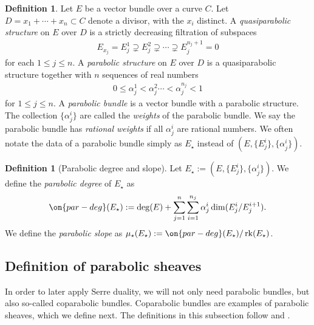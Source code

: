 \documentclass[12 pt]{amsart}
\theoremstyle{plain}
\theoremstyle{definition}
\newtheorem{definition}[subsubsection]{Definition}
\theoremstyle{remark}
\numberwithin{equation}{section}
\DeclareMathOperator\rk{rk}
\begin{document}
\begin{definition}
	\label{definition:parabolic-bundle}
	Let $E$ be a vector bundle over a curve $C$.
	Let $D = x_1 + \cdots + x_n \subset C$ denote a divisor, with the $x_i$ distinct.
	A {\em quasiparabolic structure} on $E$ over $D$ is a strictly decreasing
	filtration of subspaces
	\begin{align*}
		E_{x_j} = E_j^1 \supsetneq E_j^2 \supsetneq \cdots \supsetneq E_j^{n_j+1}
		= 0
	\end{align*}
	for each $1 \leq j \leq n$.
	A {\em parabolic structure} on $E$ over $D$ is a quasiparabolic
	structure together with
	$n$ sequences of real numbers
	\begin{align*}
		0 \leq \alpha^1_j < \alpha^2_j \cdots < \alpha^{n_j}_j < 1
	\end{align*}
	for $1 \leq j \leq n$.
	A {\em parabolic bundle} is a vector bundle with a parabolic structure.
	The collection $\{\alpha^i_j\}$ are called the {\em weights} of the
	parabolic bundle. We say the parabolic bundle has {\em rational weights} if
	all $\alpha^i_j$ are rational numbers.
	We often notate the data of a parabolic bundle simply as $E_\star$
	instead of $(E, \{E^i_j\}, \{\alpha^i_j\})$.
\end{definition}

\begin{definition}[Parabolic degree and slope]
	\label{definition:}
	Let $E_\star := (E, \{E^i_j\}, \{\alpha^i_j\})$. We define the {\em
	parabolic degree} of $E_\star$ as
\begin{align*}
	\on{par-deg}(E_\star) := \deg(E) + \sum_{j=1}^n \sum_{i=1}^{n_j}
	\alpha^i_j \dim(E_j^i/E_j^{i+1}).
\end{align*}
We define the {\em parabolic slope} as $\mu_\star(E_\star) :=
\on{par-deg}(E_\star)/\rk(E_\star)$.
\end{definition}

\subsection{Definition of parabolic sheaves}
\label{subsubsection:parabolic-sheaf}

In order to later apply Serre duality, we will not only need parabolic bundles, but also so-called
coparabolic bundles. Coparabolic bundles are examples of parabolic sheaves,
which we define next.
The definitions in this subsection follow
\cite{yokogawa:infinitesimal-deformation} and
\cite{bodenY:moduli-spaces-of-parabolic-higgs-bundles}.
\end{document}
